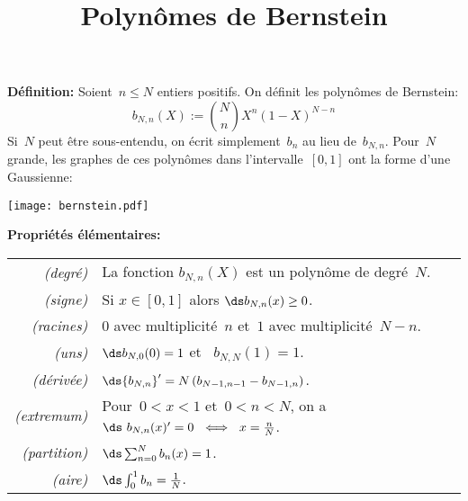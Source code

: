 \title{Polynômes de Bernstein}

{\bf Définition:}
Soient~$n\le N$ entiers positifs.  On définit les polynômes de Bernstein:
\[
b_{N,n}(X) := {N\choose n}X^n(1-X)^{N-n}
\]
Si~$N$ peut être sous-entendu, on écrit simplement~$b_n$ au lieu de~$b_{N,n}$.
Pour~$N$ grande, les graphes de ces polynômes dans l'intervalle~$[0,1]$ ont la
forme d'une Gaussienne:

\texttt{[image: bernstein.pdf]}

{\bf Propriétés élémentaires:}

\begin{tabular}{rl}
	\it (degré) & La fonction $b_{N,n}(X)$ est un polynôme de degré~$N$.\\
	\it (signe) & Si $x\in[0,1]$ alors $\ds b_{N,n}(x)\ge 0$.\\
	\it (racines) & $0$ avec multiplicité~$n$ et~$1$ avec multiplicité~$N-n$.\\
	\it (uns)& $\ds b_{N,0}(0)=1$ et ~$b_{N,N}(1)=1$.\\
	\it (dérivée)& $\ds {b_{N,n}}'=N\left(b_{N-1,n-1}-b_{N-1,n}\right)$.\\
	\it (extremum)& Pour~$0<x<1$ et~$0<n<N$, on a
	$\ds\ b_{N,n}(x)'=0\ \iff\ x=\frac{n}{N}$.\\
	\it (partition)& $\ds\sum_{n=0}^Nb_n(x)=1$.\\
	\it (aire)& $\ds\int_0^1b_n=\frac{1}{N}$.\\
\end{tabular}



